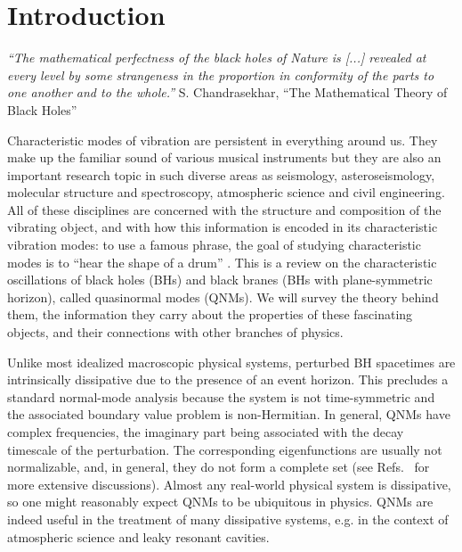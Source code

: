 \documentclass[]{iopart}
\begin{document}
\section{Introduction}


{\it ``The mathematical perfectness of the black holes of Nature is
[...] revealed at every level by some strangeness
in the proportion in conformity of the parts to one another and to the whole.''}
\hspace{.5cm} 
S. Chandrasekhar, ``The Mathematical Theory of Black Holes''
\vskip 2mm

Characteristic modes of vibration are persistent in everything around us.
They make up the familiar sound of various musical instruments but they are
also an important research topic in such diverse areas as seismology,
asteroseismology, molecular structure and spectroscopy, atmospheric science
and civil engineering. All of these disciplines are concerned with the
structure and composition of the vibrating object, and with how this
information is encoded in its characteristic vibration modes: to use a famous
phrase, the goal of studying characteristic modes is to ``hear the shape of a
drum'' \cite{Kac:1966xd}.  This is a review on the characteristic oscillations
of black holes (BHs) and black branes (BHs with plane-symmetric horizon),
called quasinormal modes (QNMs). We will survey the theory behind them, the
information they carry about the properties of these fascinating objects, and
their connections with other branches of physics.

Unlike most idealized macroscopic physical systems, perturbed BH spacetimes
are intrinsically dissipative due to the presence of an event horizon.  This
precludes a standard normal-mode analysis because the system is not
time-symmetric and the associated boundary value problem is non-Hermitian.  In
general, QNMs have complex frequencies, the imaginary part being associated
with the decay timescale of the perturbation. The corresponding eigenfunctions
are usually not normalizable, and, in general, they do not form a complete set
(see Refs.~\cite{RevModPhys.70.1545,Nollert:1998ys} for more extensive
discussions). Almost any real-world physical system is dissipative, so one
might reasonably expect QNMs to be ubiquitous in physics. QNMs are indeed
useful in the treatment of many dissipative systems, e.g. in the context of
atmospheric science and leaky resonant cavities.
\end{document}
